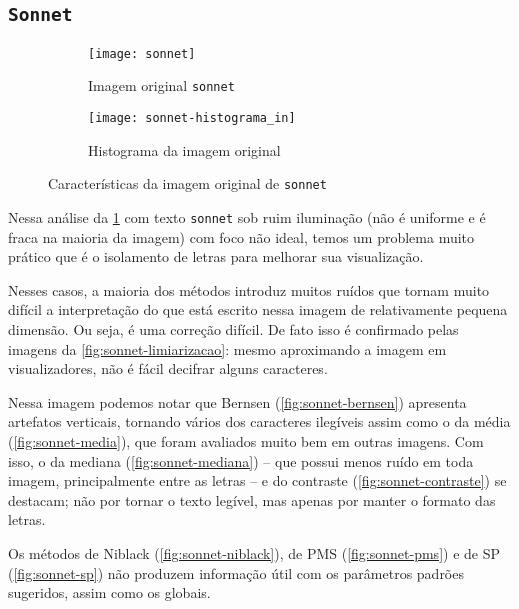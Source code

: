 \documentclass[brazilian,a4paper,twocolumn]{article}
\begin{document}
    \subsection{\texttt{Sonnet}}
    \label{sec:sonnet}

        \begin{figure}[h]
            \centering
            \begin{subfigure}{0.30\textwidth}
                \texttt{[image: sonnet]}
                \caption{Imagem original \texttt{sonnet}}
                \label{fig:sonnet}
            \end{subfigure}
            \begin{subfigure}{0.5\textwidth}
                \texttt{[image: sonnet-histograma\_in]}
                \caption{Histograma da imagem original}
                \label{fig:sonnet-histograma}
            \end{subfigure}

            \caption{Características da imagem original de \texttt{sonnet}}
        \end{figure}

        Nessa análise da \cref{fig:sonnet} com texto \texttt{sonnet} sob ruim iluminação (não é uniforme e é fraca na maioria da imagem) com foco não ideal, temos um problema muito prático que é o isolamento de letras para melhorar sua visualização.

        Nesses casos, a maioria dos métodos introduz muitos ruídos que tornam muito difícil a interpretação do que está escrito nessa imagem de relativamente pequena dimensão. Ou seja, é uma correção difícil. De fato isso é confirmado pelas imagens da \cref{fig:sonnet-limiarizacao}: mesmo aproximando a imagem em visualizadores, não é fácil decifrar alguns caracteres.

        Nessa imagem podemos notar que Bernsen (\cref{fig:sonnet-bernsen}) apresenta artefatos verticais, tornando vários dos caracteres ilegíveis assim como o da média (\cref{fig:sonnet-media}), que foram avaliados muito bem em outras imagens. Com isso, o da mediana (\cref{fig:sonnet-mediana}) -- que possui menos ruído em toda imagem, principalmente entre as letras -- e do contraste (\cref{fig:sonnet-contraste}) se destacam; não por tornar o texto legível, mas apenas por manter o formato das letras.

        Os métodos de Niblack (\cref{fig:sonnet-niblack}), de PMS (\cref{fig:sonnet-pms}) e de SP (\cref{fig:sonnet-sp}) não produzem informação útil com os parâmetros padrões sugeridos, assim como os globais.
\end{document}
